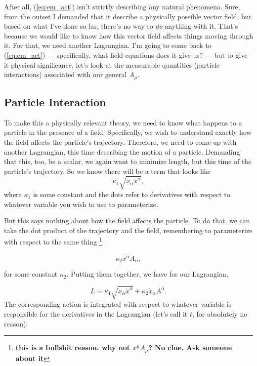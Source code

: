 \documentclass[11pt]{article}
\begin{document}
After all, (\ref{eq:em_act}) isn't strictly describing any natural phenomena.  Sure, from the outset I demanded that it describe a physically possible vector field, but based on what I've done so far, there's no way to \emph{do} anything with it.   That's because we would like to know how this vector field affects things moving through it.  For that, we need another Lagrangian.  I'm going to come back to (\ref{eq:em_act}) --- specifically, what field equations does it give us? --- but to give it physical significance, let's look at the measurable quantities (particle interactions) associated with our general $A_\mu$.

\subsection{Particle Interaction}
To make this a physically relevant theory, we need to know what happens to a particle in the presence of a field.  Specifically, we wish to understand exactly how the field affects the particle's trajectory.  Therefore, we need to come up with another Lagrangian, this time describing the motion of a particle.  Demanding that this, too, be a scalar, we again want to minimize length, but this time of the particle's trajectory.  So we know there will be a term that looks like
\begin{equation*}
\kappa_1 \sqrt{\dot{x}_\alpha\dot{x}^\alpha},
\end{equation*}
where $\kappa_1$ is some constant and the dots refer to derivatives with respect to whatever variable you wish to use to parameterize.

But this says nothing about how the field affects the particle.  To do that, we can take the dot product of the trajectory and the field, remembering to parameterize with respect to the same thing \footnote{\textbf{this is a bullshit reason.  why not $x^\mu A_\mu$? No clue. Ask someone about it}}:

\begin{equation*}
\kappa_2 \dot{x^\alpha}A_\alpha,
\end{equation*}

for some constant $\kappa_2$.  Putting them together, we have for our Lagrangian,

\begin{equation}\label{eq:particle_lagr}
L = \kappa_1 \sqrt{\dot{x}_\alpha\dot{x}^\alpha} + \kappa_2 \dot{x}_\alpha A^\alpha.
\end{equation}
The corresponding action is integrated with respect to whatever variable is responsible for the derivatives in the Lagrangian (let's call it $t$, for absolutely no reason):
\end{document}
